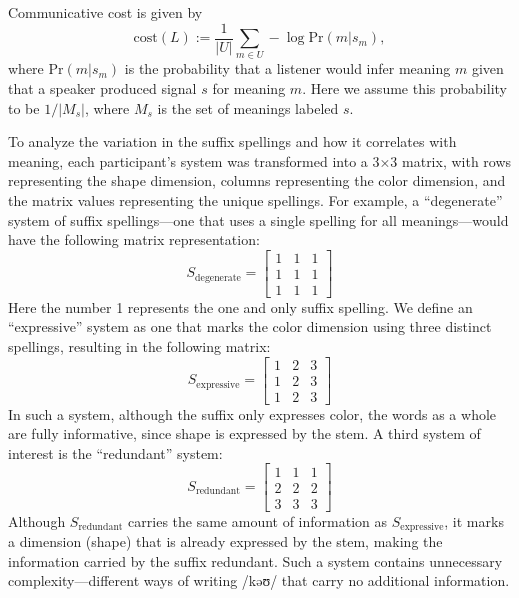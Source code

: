 \documentclass[doc,biblatex]{apa7}
\begin{document}
Communicative cost is given by
\begin{equation}
\mathrm{cost}(L) := \frac{1}{|U|} \sum_{m \in U} -\log \mathrm{Pr}(m|s_m),
\end{equation}
where $\mathrm{Pr}(m|s_m)$ is the probability that a listener would infer meaning $m$ given that a speaker produced signal $s$ for meaning $m$. Here we assume this probability to be $1/|M_s|$, where $M_s$ is the set of meanings labeled $s$.

To analyze the variation in the suffix spellings and how it correlates with meaning, each participant's system was transformed into a 3×3 matrix, with rows representing the shape dimension, columns representing the color dimension, and the matrix values representing the unique spellings. For example, a ``degenerate'' system of suffix spellings---one that uses a single spelling for all meanings---would have the following matrix representation:
\begin{equation}
	S_\mathrm{degenerate} = \begin{bmatrix}
	1 & 1 & 1 \\
	1 & 1 & 1 \\
	1 & 1 & 1
	\end{bmatrix}
\end{equation}
Here the number 1 represents the one and only suffix spelling. We define an ``expressive'' system as one that marks the color dimension using three distinct spellings, resulting in the following matrix:
\begin{equation}
	S_\mathrm{expressive} = \begin{bmatrix}
	1 & 2 & 3 \\
	1 & 2 & 3 \\
	1 & 2 & 3
	\end{bmatrix}
\end{equation}
In such a system, although the suffix only expresses color, the words as a whole are fully informative, since shape is expressed by the stem. A third system of interest is the ``redundant'' system:
\begin{equation}
	S_\mathrm{redundant} = \begin{bmatrix}
	1 & 1 & 1 \\
	2 & 2 & 2 \\
	3 & 3 & 3
	\end{bmatrix}
\end{equation}
Although $S_\mathrm{redundant}$ carries the same amount of information as $S_\mathrm{expressive}$, it marks a dimension (shape) that is already expressed by the stem, making the information carried by the suffix redundant. Such a system contains unnecessary complexity---different ways of writing /kəʊ/ that carry no additional information.
\end{document}
